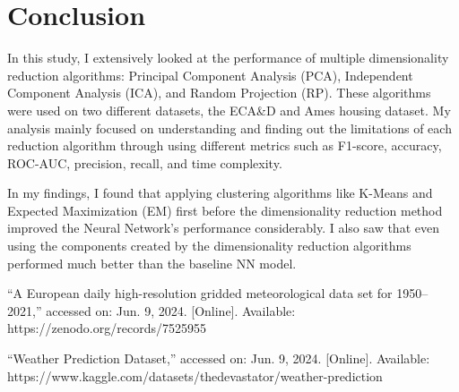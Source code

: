 \documentclass[conference]{IEEEtran}
\begin{document}
\section{Conclusion}
In this study, I extensively looked at the performance of multiple dimensionality reduction algorithms: Principal Component Analysis (PCA), Independent Component Analysis (ICA), and Random Projection (RP). These algorithms were used on two different datasets, the ECA\&D and Ames housing dataset. My analysis mainly focused on understanding and finding out the limitations of each reduction algorithm through using different metrics such as F1-score, accuracy, ROC-AUC, precision, recall, and time complexity.
\par In my findings, I found that applying clustering algorithms like K-Means and Expected Maximization (EM) first before the dimensionality reduction method improved the Neural Network's performance considerably. I also saw that even using the components created by the dimensionality reduction algorithms performed much better than the baseline NN model. 


\begin{thebibliography}{1}

``A European daily high-resolution gridded meteorological data set for 1950–2021,'' accessed on: Jun. 9, 2024. [Online]. Available: https://zenodo.org/records/7525955

``Weather Prediction Dataset,'' accessed on: Jun. 9, 2024. [Online]. Available: https://www.kaggle.com/datasets/thedevastator/weather-prediction

\end{thebibliography}
\end{document}
